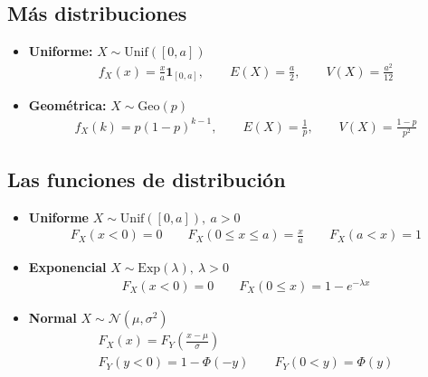 \documentclass[a4paper,twocolumn]{extarticle}
\theoremstyle{remark}
\newcommand{\normal}{\mathcal{N}}
\begin{document}
\subsection{Más distribuciones}

\begin{itemize}
	\item \textbf{Uniforme:} $X \sim \text{Unif}([0,a])$
	\begin{align*}
		f_X(x) = \frac{x}{a}\mathbf{1}_{[0,a]},\qquad E(X) = \frac{a}{2},\qquad V(X) = \frac{a^2}{12}
	\end{align*}
	\item \textbf{Geométrica:} $X \sim \text{Geo}(p)$
	\begin{align*}
		f_X(k) = p(1-p)^{k-1},\qquad E(X) = \frac{1}{p},\qquad V(X) = \frac{1-p}{p^2}
	\end{align*}
\end{itemize}

\subsection{Las funciones de distribución}
\begin{itemize}
	\item \textbf{Uniforme} $X \sim \text{Unif}([0,a]),\ a > 0$
	\begin{align*}
		F_X(x < 0) = 0\qquad F_X(0 \leq x \leq a) = \frac{x}{a} \qquad F_X(a < x) = 1
	\end{align*}
	\item \textbf{Exponencial} $X \sim \text{Exp}(\lambda),\ \lambda > 0$
	\begin{align*}
		F_X(x < 0) = 0 \qquad F_X(0 \leq x) = 1 - e^{-\lambda x}
	\end{align*}
	\item \textbf{Normal} $X \sim \normal(\mu, \sigma^2)$
	\begin{align*}
		F_X(x) = F_Y(\frac{x - \mu}{\sigma}) \\
		F_Y(y < 0) = 1 - \Phi(-y) \qquad F_Y(0 < y) = \Phi(y)
	\end{align*}
\end{itemize}
\end{document}
